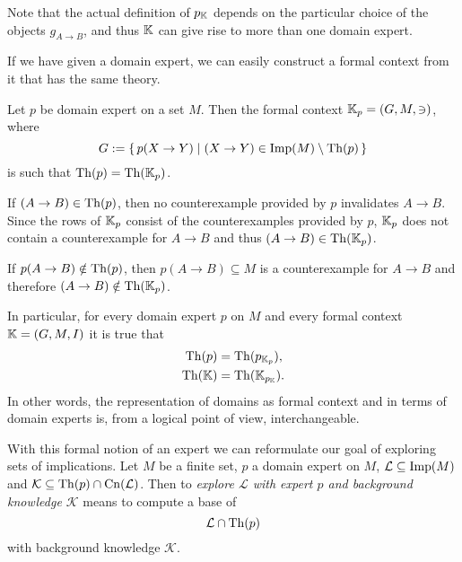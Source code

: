 Note that the actual definition of $p_{{\mathbb{K}}}$ depends on the particular choice of the
objects $g_{A \to B}$, and thus ${\mathbb{K}}$ can give rise to more than one domain expert.

If we have given a domain expert, we can easily construct a formal context from it that
has the same theory.

\begin{Proposition}
  \label{prop:domain-from-domain-expert}
  Let $p$ be domain expert on a set $M$.  Then the formal context ${\mathbb{K}}_p = (G, M, \ni)$,
  where
  \begin{equation*}
    G := {\{\, p(X \to Y) \mid (X \to Y) \in \operatorname{Imp}(M) \setminus \operatorname{Th}(p) \,\}}
  \end{equation*}
  is such that $\operatorname{Th}(p) = \operatorname{Th}({\mathbb{K}}_p)$.
\end{Proposition}
\begin{Proof}
  If $(A \to B) \in \operatorname{Th}(p)$, then no counterexample provided by $p$ invalidates $A \to
  B$.  Since the rows of ${\mathbb{K}}_p$ consist of the counterexamples provided by $p$, ${\mathbb{K}}_p$ does not contain a counterexample for $A \to B$ and thus $(A \to B) \in \operatorname{Th}({\mathbb{K}}_p)$.

  If $p(A \to B) \notin \operatorname{Th}(p)$, then $p(A \to B) \subseteq M$ is a counterexample for $A
  \to B$ and therefore $(A \to B) \notin \operatorname{Th}({\mathbb{K}}_p)$.
\end{Proof}

In particular, for every domain expert $p$ on $M$ and every formal context ${\mathbb{K}} = (G,
M, I)$ it is true that
\begin{align*}
  \operatorname{Th}(p) &= \operatorname{Th}(p_{{\mathbb{K}}_p}), \\
  \operatorname{Th}({\mathbb{K}}) &= \operatorname{Th}({\mathbb{K}}_{p_{{\mathbb{K}}}}).
\end{align*}
In other words, the representation of domains as formal context and in terms of domain
experts is, from a logical point of view, interchangeable.

With this formal notion of an expert we can reformulate our goal of exploring sets of
implications.  Let $M$ be a finite set, $p$ a domain expert on $M$, $\mathcal{L} \subseteq
\operatorname{Imp}(M)$ and $\mathcal{K} \subseteq \operatorname{Th}(p) \cap \operatorname{Cn}(\mathcal{L})$.  Then to \emph{explore
  $\mathcal{L}$ with expert $p$ and background knowledge $\mathcal{K}$} means to compute a
base of
\begin{equation*}
  \mathcal{L} \cap \operatorname{Th}(p)
\end{equation*}
with background knowledge $\mathcal{K}$.


